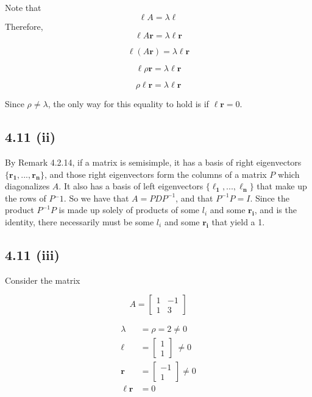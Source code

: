 \documentclass[letterpaper,12pt]{article}
\theoremstyle{definition}
\begin{document}
Note that \\
\[  \mathbf{\ell} A = \lambda \mathbf{\ell} \]
Therefore,
\[ \mathbf{\ell}A \mathbf{r} = \lambda \mathbf{\ell} \mathbf{r} \]

\[ \mathbf{\ell}(A \mathbf{r}) = \lambda \mathbf{\ell}\mathbf{r} \]

\[ \mathbf{\ell}\rho \mathbf{r} = \lambda \mathbf{\ell}\mathbf{r} \]

\[ \rho \mathbf{\ell}\mathbf{r} = \lambda \mathbf{\ell} \mathbf{r}\]
 
Since $\rho \neq \lambda$, the only way for this equality to hold is if $ \mathbf{\ell}\mathbf{r}= 0$.

\subsection*{4.11 (ii)}
By Remark 4.2.14, if a matrix is semisimple, it has a basis of right eigenvectors $\{\mathbf{r_1,...,r_n}\}$, and those right eigenvectors form the columns of a matrix $P$ which diagonalizes $A$. It also has a basis of left eigenvectors $\{\mathbf{\ell_1,...,\ell_n}\}$ that make up the rows of $P{^-1}$. So we have that $A = PDP^{-1}$, and that $P^{-1}P = I$. Since the product $P^{-1}P$ is made up solely of products of some $l_i$ and some $\mathbf{r_i}$, and is the identity, there necessarily must be some $l_i$ and some $\mathbf{r_i}$ that yield a 1.

\subsection*{4.11 (iii)}

Consider the matrix 

\[A = \begin{bmatrix}
1 & -1\\
1 & 3
\end{bmatrix}\]

\begin{align*}
\lambda &= \rho = 2 \neq 0\\
\mathbf{\ell} &= \begin{bmatrix}
1\\
1
\end{bmatrix} \ \neq 0\\
\mathbf{r} &= \begin{bmatrix}
-1\\
1
\end{bmatrix} \neq 0 \\
\mathbf{\ell r} &= 0
\end{align*}
\end{document}
